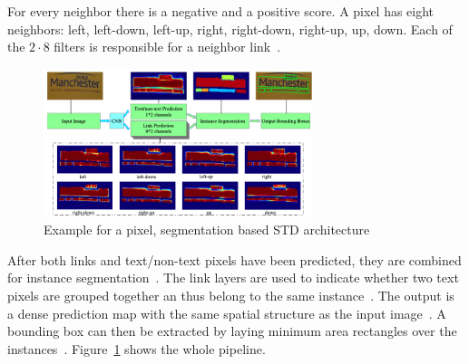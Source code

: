 For every neighbor there is a negative and a positive score.
A pixel has eight neighbors: left, left-down, left-up, right, right-down, right-up, up, down.
Each of the $2\cdot8$ filters is responsible for a neighbor link~\citep{deng_pixellink_2018}.
\begin{figure}[hb]
    \centering
    \includegraphics[width=0.7\textwidth]{img/STD-seg-based-architecture-Deng-PixelLink-2018.png}
    \caption[Pixel, segmentation based STD architecture]{%
        Example for a pixel, segmentation based STD
        architecture~\citep{deng_pixellink_2018}\label{fig:STD-segbased-pixel-architecture}
    }
\end{figure}
After both links and text/non-text pixels have been predicted, they are combined for instance
segmentation~\citep{deng_pixellink_2018}.
The link layers are used to indicate whether two text pixels are grouped together an thus belong to
the same instance~\citep{deng_pixellink_2018}.
The output is a dense prediction map with the same spatial structure as the input
image~\citep{deng_pixellink_2018}.
A bounding box can then be extracted by laying minimum area rectangles over the
instances~\citep{deng_pixellink_2018}.
Figure~\ref{fig:STD-segbased-pixel-architecture} shows the whole pipeline.


